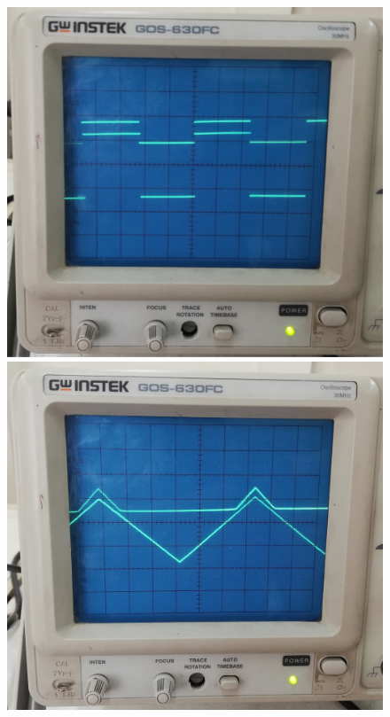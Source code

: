 \documentclass[letter,twoside,11pt]{article}
\begin{document}
\begin{figure}[!h]
\centering
\includegraphics[scale=0.071]{fotos/labo1.5.eps}
\includegraphics[scale=0.069]{fotos/labo1.6.eps}

\end{figure}
\end{document}
